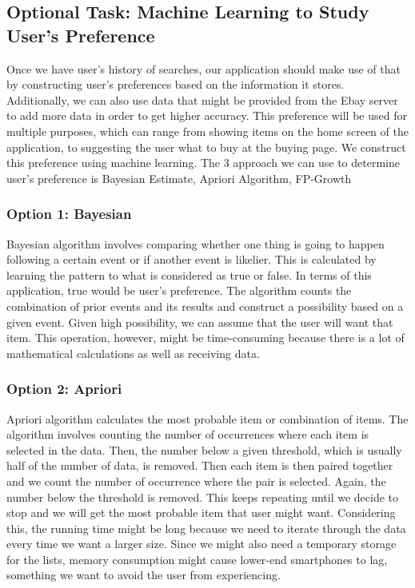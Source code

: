 \documentclass[journal,compsoc, 10pt, draftclsnofoot, onecolumn]{IEEEtran}
\begin{document}
\subsection{Optional Task: Machine Learning to Study User's Preference}
Once we have user’s history of searches, our application should make use of that by constructing user’s preferences based on the information it stores. Additionally, we can also use data that might be provided from the Ebay server to add more data in order to get higher accuracy. This preference will be used for multiple purposes, which can range from showing items on the home screen of the application, to suggesting the user what to buy at the buying page. We construct this preference using machine learning.
The 3 approach we can use to determine user’s preference is Bayesian Estimate, Apriori Algorithm, FP-Growth

\subsubsection{Option 1: Bayesian}
Bayesian algorithm involves comparing whether one thing is going to happen following a certain event or if another event is likelier. This is calculated by learning the pattern to what is considered as true or false. In terms of this application, true would be user’s preference. The algorithm counts the combination of prior events and its results and construct a possibility based on a given event. Given high possibility, we can assume that the user will want that item. This operation, however, might be time-consuming because there is a lot of mathematical calculations as well as receiving data.

\subsubsection{Option 2: Apriori}
Apriori algorithm calculates the most probable item or combination of items. The algorithm involves counting the number of occurrences where each item is selected in the data. Then, the number below a given threshold, which is usually half of the number of data, is removed. Then each item is then paired together and we count the number of occurrence where the pair is selected. Again, the number below the threshold is removed. This keeps repeating until we decide to stop and we will get the most probable item that user might want. Considering this, the running time might be long because we need to iterate through the data every time we want a larger size. Since we might also need a temporary storage for the lists, memory consumption might cause lower-end smartphones to lag, something we want to avoid the user from experiencing.
\end{document}
